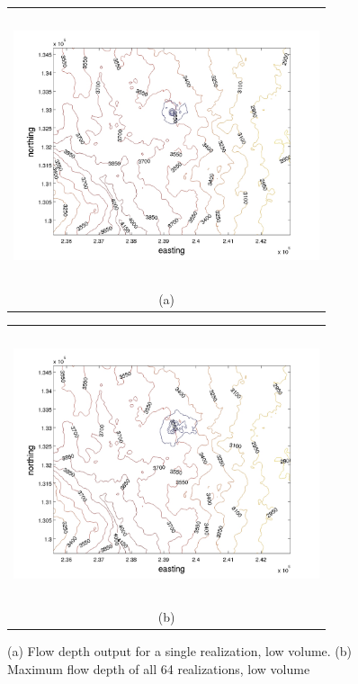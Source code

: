\documentclass[a4paper,fleqn]{article}
\begin{document}
\begin{figure}[H]
    \begin{minipage}[b]{0.6\textwidth}
        \begin{tabular}{c}
        \includegraphics[width=9cm,height=8cm,keepaspectratio]{sample1_low_flow.jpg}\\
        (a)
        \end{tabular}
    \end{minipage}
    \begin{minipage}{0.6\textwidth}
        \begin{tabular}{c}
        \includegraphics[width=9cm,height=8cm,keepaspectratio]{all_low_flow.jpg}\\
        (b)
        \end{tabular}
    \end{minipage} 
\caption{(a) Flow depth output for a single realization, low volume. (b) Maximum flow depth of all 64 realizations, low volume }
\label{fig2}  
\end{figure}
\end{document}
